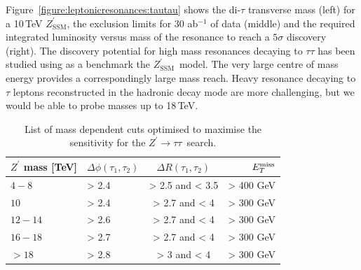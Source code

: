 \documentclass[a4paper,11pt]{article}
\newcommand{\Zp}{\ensuremath{Z^{\prime}}}
\newcommand{\ZpSSM}{\ensuremath{Z^{\prime}_{\mathrm{SSM}}}}
\newcommand*{\Zptata}{\ensuremath{Z^{\prime}\rightarrow \tau\tau}}
\newcommand*{\met}{\ensuremath{E_{T}^{\rm{miss}}}}
\begin{document}
Figure~\ref{figure:leptonicresonances:tautau} shows the di-$\tau$ transverse mass (left) for a 10\,TeV \ZpSSM, the exclusion limits for 30 ab$^{-1}$ of data (middle) and the required integrated luminosity versus mass of the resonance to reach a $5\sigma$ discovery (right).
The discovery potential for high mass resonances decaying to $\tau\tau$ has been studied using as a benchmark the \ZpSSM\ model. The very large centre of mass energy provides a correspondingly large mass reach. Heavy resonance decaying to $\tau$ leptons reconstructed in the hadronic decay mode are more challenging, but we would be able to probe masses up to 18\,TeV.

\begin{table}[htbp]
   \centering
\begin{tabular}{|l|l|c|r|}
  \hline
  \hline
   $\Zp$ mass [TeV] &  $\Delta \phi(\tau_1, \tau_2)$&  $\Delta R(\tau_1, \tau_2)$ & $\met$\\
  \hline
  $4-8$ & > 2.4 & > 2.5 and < 3.5 & > 400 GeV\\
  $10$ & > 2.4 & > 2.7 and < 4 & > 300 GeV\\
  $12-14$ & > 2.6 & > 2.7 and < 4 & > 300 GeV\\
  $16-18$ & > 2.7 & > 2.7 and < 4 & > 300 GeV\\
  $>18$ & > 2.8 & > 3 and < 4 & > 300 GeV\\
  \hline
  \hline
  \end{tabular}
  \caption{List of mass dependent cuts optimised to maximise the sensitivity for the \Zptata\ search.}
  \label{tab:leptonicresonances:tautau}
\end{table}
\end{document}
